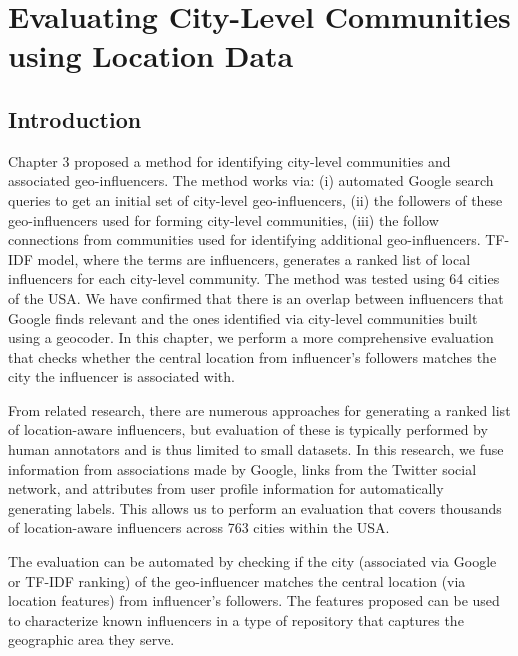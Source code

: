 \chapter{Evaluating City-Level Communities using Location Data}\label{chap4}

\setlength{\abovedisplayskip}{-10pt} \setlength{\abovedisplayshortskip}{-10pt}

\section{Introduction}
Chapter 3 proposed a method for identifying city-level communities and associated geo-influencers. The method works via: (i) automated Google search queries to get an initial set of city-level geo-influencers, (ii) the followers of these geo-influencers used for forming city-level communities, (iii) the follow connections from communities used for identifying additional geo-influencers. TF-IDF model, where the terms are influencers, generates a ranked list of local influencers for each city-level community. The method was tested using 64 cities of the USA. We have confirmed that there is an overlap between influencers that Google finds relevant and the ones identified via city-level communities built using a geocoder. In this chapter, we perform a more comprehensive evaluation that checks whether the central location from influencer's followers matches the city the influencer is associated with.

From related research, there are numerous approaches for generating a ranked list of location-aware influencers, but evaluation of these is typically performed by human annotators and is thus limited to small datasets. In this research, we fuse information from associations made by Google, links from the Twitter social network, and attributes from user profile information for automatically generating labels. This allows us to perform an evaluation that covers thousands of location-aware influencers across 763 cities within the USA.

The evaluation can be automated by checking if the city (associated via Google or TF-IDF ranking) of the geo-influencer matches the central location (via location features) from influencer's followers. The features proposed can be used to characterize known influencers in a type of repository that captures the geographic area they serve. 

